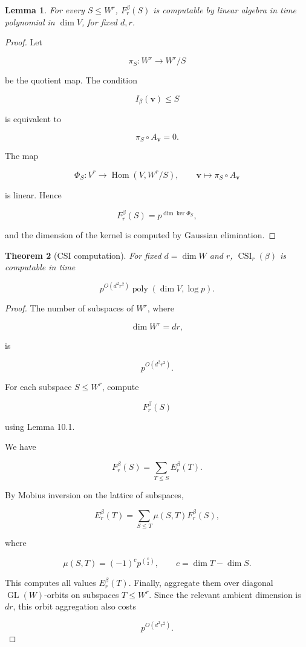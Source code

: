 \documentclass[11pt]{article}
\newtheorem{theorem}{Theorem}[section]
\newtheorem{lemma}[theorem]{Lemma}
\begin{document}
\begin{lemma}

For every $S\le W^r$, $F_r^\beta(S)$ is computable by linear algebra in time polynomial in $\dim V$, for fixed $d,r$.

\end{lemma}
\begin{proof}

Let

\[
\pi_S:W^r\to W^r/S
\]

be the quotient map. The condition

\[
I_\beta(\mathbf v)\le S
\]

is equivalent to

\[
\pi_S\circ A_{\mathbf v}=0.
\]

The map

\[
\Phi_S:V^r\to\operatorname{Hom}(V,W^r/S),
\qquad
\mathbf v\mapsto \pi_S\circ A_{\mathbf v}
\]

is linear. Hence

\[
F_r^\beta(S)=p^{\dim\ker\Phi_S},
\]

and the dimension of the kernel is computed by Gaussian elimination.
\end{proof}

\begin{theorem}[CSI computation]

For fixed $d=\dim W$ and $r$, $\operatorname{CSI}_r(\beta)$ is computable in time

\[
p^{O(d^2r^2)}\operatorname{poly}(\dim V,\log p).
\]

\end{theorem}
\begin{proof}

The number of subspaces of $W^r$, where

\[
\dim W^r=dr,
\]

is

\[
p^{O(d^2r^2)}.
\]

For each subspace $S\le W^r$, compute

\[
F_r^\beta(S)
\]

using Lemma 10.1.

We have

\[
F_r^\beta(S)
=\sum_{T\le S}E_r^\beta(T).
\]

By Mobius inversion on the lattice of subspaces,

\[
E_r^\beta(T)
=\sum_{S\le T}
\mu(S,T)F_r^\beta(S),
\]

where

\[
\mu(S,T)
=(-1)^c p^{\binom c2},
\qquad
c=\dim T-\dim S.
\]

This computes all values $E_r^\beta(T)$. Finally, aggregate them over diagonal $\operatorname{GL}(W)$-orbits on subspaces $T\le W^r$. Since the relevant ambient dimension is $dr$, this orbit aggregation also costs

\[
p^{O(d^2r^2)}.
\]

\end{proof}
\end{document}
